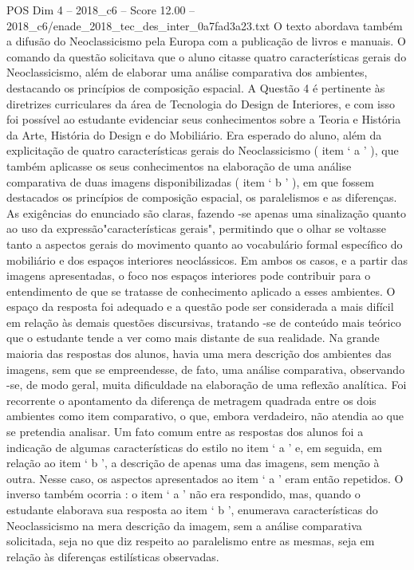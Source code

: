 \begin{textsample}{POS Dim 4 – 2018\_c6 – Score 12.00 – 2018\_c6/enade\_2018\_tec\_des\_inter\_0a7fad3a23.txt}
O texto abordava também a difusão do Neoclassicismo pela Europa com a publicação de livros e manuais.
O comando da questão solicitava que o aluno citasse quatro características gerais do Neoclassicismo, além de elaborar uma análise comparativa dos ambientes, destacando os princípios de composição espacial.
A Questão 4 é pertinente às diretrizes curriculares da área de Tecnologia do Design de Interiores, e com isso foi possível ao estudante evidenciar seus conhecimentos sobre a Teoria e História da Arte, História do Design e do Mobiliário.
Era esperado do aluno, além da explicitação de quatro características gerais do Neoclassicismo ( item ‘ a ’ ), que também aplicasse os seus conhecimentos na elaboração de uma análise comparativa de duas imagens disponibilizadas ( item ‘ b ’ ), em que fossem destacados os princípios de composição espacial, os paralelismos e as diferenças.
As exigências do enunciado são claras, fazendo -se apenas uma sinalização quanto ao uso da expressão"características gerais", permitindo que o olhar se voltasse tanto a aspectos gerais do movimento quanto ao vocabulário formal específico do mobiliário e dos espaços interiores neoclássicos.
Em ambos os casos, e a partir das imagens apresentadas, o foco nos espaços interiores pode contribuir para o entendimento de que se tratasse de conhecimento aplicado a esses ambientes.
O espaço da resposta foi adequado e a questão pode ser considerada a mais difícil em relação às demais questões discursivas, tratando -se de conteúdo mais teórico que o estudante tende a ver como mais distante de sua realidade.
Na grande maioria das respostas dos alunos, havia uma mera descrição dos ambientes das imagens, sem que se empreendesse, de fato, uma análise comparativa, observando -se, de modo geral, muita dificuldade na elaboração de uma reflexão analítica.
Foi recorrente o apontamento da diferença de metragem quadrada entre os dois ambientes como item comparativo, o que, embora verdadeiro, não atendia ao que se pretendia analisar.
Um fato comum entre as respostas dos alunos foi a indicação de algumas características do estilo no item ‘ a ’ e, em seguida, em relação ao item ‘ b ’, a descrição de apenas uma das imagens, sem menção à outra.
Nesse caso, os aspectos apresentados ao item ‘ a ’ eram então repetidos.
O inverso também ocorria : o item ‘ a ’ não era respondido, mas, quando o estudante elaborava sua resposta ao item ‘ b ’, enumerava características do Neoclassicismo na mera descrição da imagem, sem a análise comparativa solicitada, seja no que diz respeito ao paralelismo entre as mesmas, seja em relação às diferenças estilísticas observadas.

\end{textsample}

